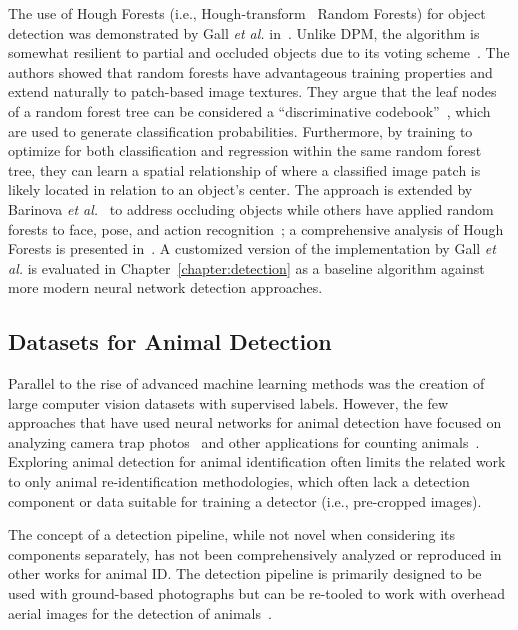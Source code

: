The use of Hough Forests (i.e., Hough-transform~\cite{ballard_generalizing_1981} Random Forests) for object detection was demonstrated by Gall \textit{et al.} in~\cite{gall_class-specific_2009}.  Unlike DPM, the algorithm is somewhat resilient to partial and occluded objects due to its voting scheme~\cite{winn_layout_2006,bonde_robust_2014}.  The authors showed that random forests have advantageous training properties and extend naturally to patch-based image textures.  They argue that the leaf nodes of a random forest tree can be considered a ``discriminative codebook''~\cite{moosmann_fast_2006}, which are used to generate classification probabilities.  Furthermore, by training to optimize for both classification and regression within the same random forest tree, they can learn a spatial relationship of where a classified image patch is likely located in relation to an object's center.  The approach is extended by Barinova \textit{et al.}~\cite{barinova_detection_2012} to address occluding objects while others have applied random forests to face, pose, and action recognition~\cite{dantone_real-time_2012,fanelli_real_2011,yao_hough_2010}; a comprehensive analysis of Hough Forests is presented in~\cite{gall_hough_2011}.  A customized version of the implementation by Gall \textit{et al.} is evaluated in Chapter~\ref{chapter:detection} as a baseline algorithm against more modern neural network detection approaches.

\subsection{Datasets for Animal Detection}

Parallel to the rise of advanced machine learning methods was the creation of large computer vision datasets with supervised labels. However, the few approaches that have used neural networks for animal detection have focused on analyzing camera trap photos~\cite{beery_recognition_2018,verma_wild_2018,schneider_past_2019} and other applications for counting animals~\cite{sarwar_detecting_2018,trnovszky_animal_2017,lopez-vazquez_video_2020,rey_detecting_2017}.  Exploring animal detection for animal identification often limits the related work to only animal re-identification methodologies, which often lack a detection component or data suitable for training a detector (i.e., pre-cropped images).

The concept of a detection pipeline, while not novel when considering its components separately, has not been comprehensively analyzed or reproduced in other works for animal ID.  The detection pipeline is primarily designed to be used with ground-based photographs but can be re-tooled to work with overhead aerial images for the detection of animals~\cite{vermeulen_unmanned_2013,eikelboom_improving_2019,sevo_convolutional_2016,zhu_orientation_2015,sarwar_detecting_2021}.

